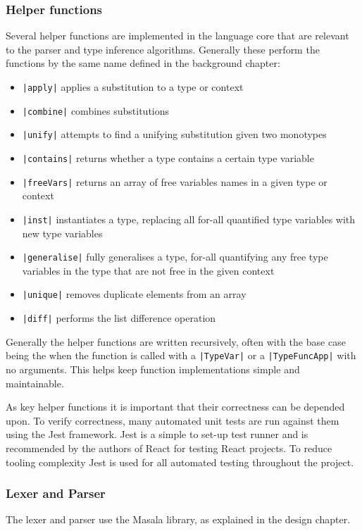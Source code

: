\documentclass[a4paper,fleqn,12pt]{article}
\begin{document}
\subsubsection{Helper functions}\label{id:h.sw77qek8b49p}
Several helper functions are implemented in the language core that are relevant to the parser and type inference algorithms. Generally these perform the functions by the same name defined in the background chapter:
\begin{itemize}
  \item \texttt{|apply|} applies a substitution to a type or context
  \item \texttt{|combine|} combines substitutions
  \item \texttt{|unify|} attempts to find a unifying substitution given two monotypes
  \item \texttt{|contains|} returns whether a type contains a certain type variable
  \item \texttt{|freeVars|} returns an array of free variables names in a given type or context
  \item \texttt{|inst|} instantiates a type, replacing all for-all quantified type variables with new type variables
  \item \texttt{|generalise|} fully generalises a type, for-all quantifying any free type variables in the type that are not free in the given context
  \item \texttt{|unique|} removes duplicate elements from an array
  \item \texttt{|diff|} performs the list difference operation
\end{itemize}

Generally the helper functions are written recursively, often with the base case being the when the function is called with a \texttt{|TypeVar|} or a \texttt{|TypeFuncApp|} with no arguments. This helps keep function implementations simple and maintainable.

As key helper functions it is important that their correctness can be depended upon. To verify correctness, many automated unit tests are run against them using the Jest framework. Jest is a simple to set-up test runner and is recommended by the authors of React for testing React projects. To reduce tooling complexity Jest is used for all automated testing throughout the project.
\subsubsection{Lexer and Parser}\label{id:h.qbtwwllp8tw6}
The lexer and parser use the Masala library, as explained in the design chapter.
\end{document}
